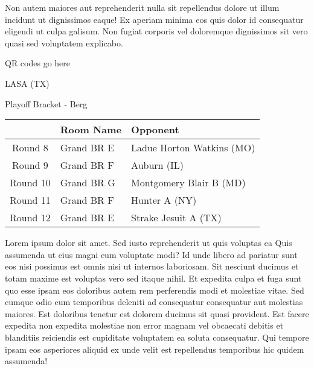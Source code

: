\documentclass{article}%
\begin{document}
\newline%
Non autem maiores aut reprehenderit nulla sit repellendus dolore ut illum incidunt ut dignissimos eaque! Ex aperiam minima eos quis dolor id consequatur eligendi ut culpa galisum. Non fugiat corporis vel doloremque dignissimos sit vero quasi sed voluptatem explicabo.\newline%
\newline%
%
\vspace*{30pt}%
\begin{center}%
\begin{Huge}%
QR codes go here%
\end{Huge}%
\end{center}%
\newpage%
\begin{center}%
\begin{Huge}%
LASA (TX)%
\end{Huge}%
\vspace*{8pt}%
\linebreak%
\begin{Large}%
Playoff Bracket {-} Berg%
\end{Large}%
\end{center}%
\begin{tabularx}{\textwidth}{|c|Y|Y|}%
\hline%
&Room Name&Opponent\\%
\hline%
Round 8&Grand BR E&Ladue Horton Watkins (MO)\\%
Round 9&Grand BR F&Auburn (IL)\\%
Round 10&Grand BR G&Montgomery Blair B (MD)\\%
Round 11&Grand BR F&Hunter A (NY)\\%
Round 12&Grand BR E&Strake Jesuit A (TX)\\%
\hline%
\end{tabularx}%
\vspace*{8pt}%
\linebreak%
\newline%
\newline%
Lorem ipsum dolor sit amet. Sed iusto reprehenderit ut quis voluptas ea Quis assumenda ut eius magni eum voluptate modi? Id unde libero ad pariatur sunt eos nisi possimus est omnis nisi ut internos laboriosam. Sit nesciunt ducimus et totam maxime est voluptas vero sed itaque nihil. Et expedita culpa et fuga sunt quo esse ipsam eos doloribus autem rem perferendis modi et molestiae vitae.\newline%
\newline%
Sed cumque odio eum temporibus deleniti ad consequatur consequatur aut molestias maiores. Est doloribus tenetur est dolorem ducimus sit quasi provident. Est facere expedita non expedita molestiae non error magnam vel obcaecati debitis et blanditiis reiciendis est cupiditate voluptatem ea soluta consequatur. Qui tempore ipsam eos asperiores aliquid ex unde velit est repellendus temporibus hic quidem assumenda!\newline%
\end{document}
